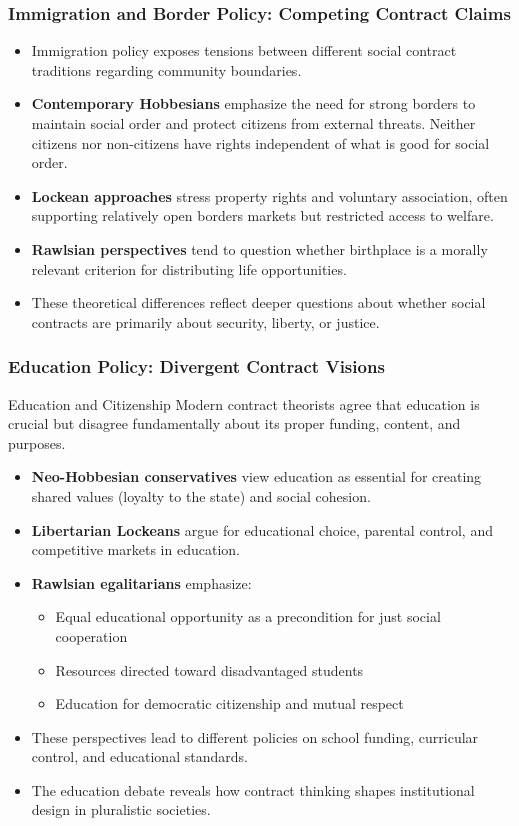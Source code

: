 \documentclass[aspectratio=169]{beamer}
\begin{document}
\begin{frame}
  \frametitle{Immigration and Border Policy: Competing Contract Claims}
  
  \begin{itemize}
    \item Immigration policy exposes tensions between different social contract traditions regarding community boundaries.
    \item \textbf{Contemporary Hobbesians} emphasize the need for strong borders to maintain social order and protect citizens from external threats. Neither citizens nor non-citizens have rights independent of what is good for social order.
    \item \textbf{Lockean approaches} stress property rights and voluntary association, often supporting relatively open borders markets but restricted access to welfare.
    \item \textbf{Rawlsian perspectives} tend to question whether birthplace is a morally relevant criterion for distributing life opportunities.
    \item These theoretical differences reflect deeper questions about whether social contracts are primarily about security, liberty, or justice.
  \end{itemize}
\end{frame}

\begin{frame}
  \frametitle{Education Policy: Divergent Contract Visions}
  
  \begin{alertblock}{Education and Citizenship}
    Modern contract theorists agree that education is crucial but disagree fundamentally about its proper funding, content, and purposes.
  \end{alertblock}
  
  \begin{itemize}
    \item \textbf{Neo-Hobbesian conservatives} view education as essential for creating shared values (loyalty to the state) and social cohesion.
    \item \textbf{Libertarian Lockeans} argue for educational choice, parental control, and competitive markets in education.
    \item \textbf{Rawlsian egalitarians} emphasize:
      \begin{itemize}
        \item Equal educational opportunity as a precondition for just social cooperation
        \item Resources directed toward disadvantaged students
        \item Education for democratic citizenship and mutual respect
      \end{itemize}
    \item These perspectives lead to different policies on school funding, curricular control, and educational standards.
    \item The education debate reveals how contract thinking shapes institutional design in pluralistic societies.
  \end{itemize}
\end{frame}
\end{document}
